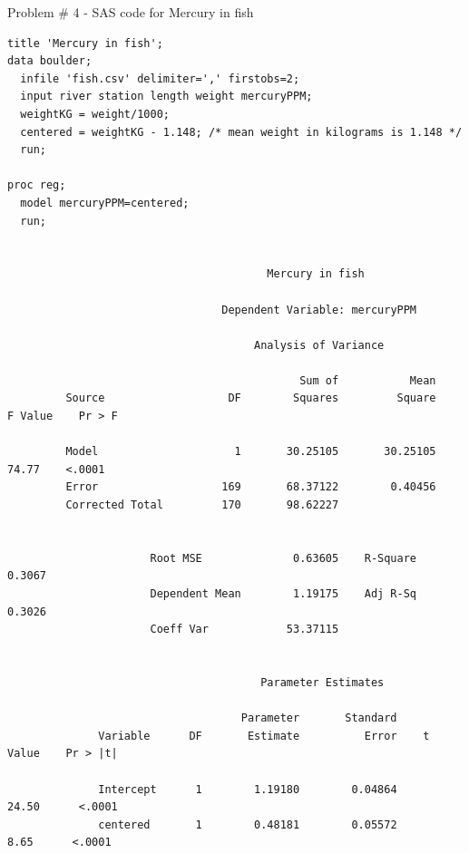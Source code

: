 \documentclass[10pt,draft]{article}
\begin{document}
\newpage
Problem \# 4 - SAS code for Mercury in fish
\begin{verbatim}
title 'Mercury in fish';
data boulder;
  infile 'fish.csv' delimiter=',' firstobs=2;
  input river station length weight mercuryPPM;
  weightKG = weight/1000;
  centered = weightKG - 1.148; /* mean weight in kilograms is 1.148 */
  run;

proc reg;
  model mercuryPPM=centered;
  run;


                                        Mercury in fish  

                                 Dependent Variable: mercuryPPM

                                      Analysis of Variance

                                             Sum of           Mean
         Source                   DF        Squares         Square    F Value    Pr > F

         Model                     1       30.25105       30.25105      74.77    <.0001
         Error                   169       68.37122        0.40456
         Corrected Total         170       98.62227


                      Root MSE              0.63605    R-Square     0.3067
                      Dependent Mean        1.19175    Adj R-Sq     0.3026
                      Coeff Var            53.37115


                                       Parameter Estimates

                                    Parameter       Standard
              Variable      DF       Estimate          Error    t Value    Pr > |t|

              Intercept      1        1.19180        0.04864      24.50      <.0001
              centered       1        0.48181        0.05572       8.65      <.0001
\end{verbatim}
\end{document}
